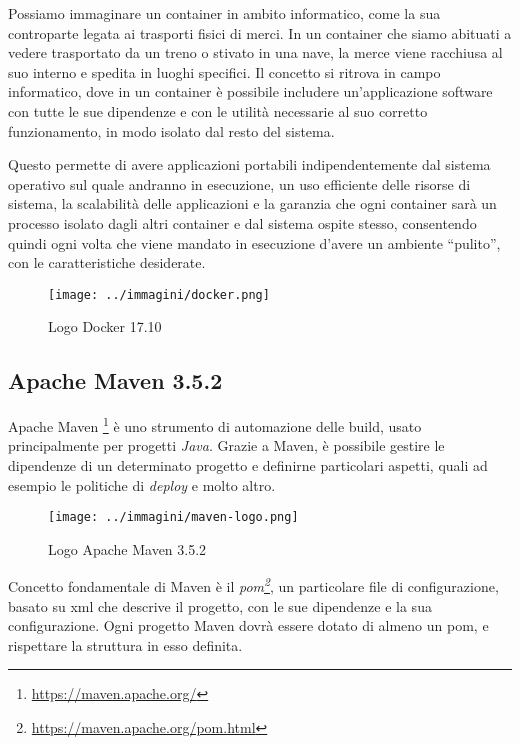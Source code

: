 Possiamo immaginare un container in ambito informatico, come la sua controparte legata ai trasporti fisici di merci. In un container che siamo abituati a vedere trasportato da un treno o stivato in una nave, la merce viene racchiusa al suo interno e spedita in luoghi specifici. Il concetto si ritrova in campo informatico, dove in un container è possibile includere un'applicazione software con tutte le sue dipendenze e con le utilità necessarie al suo corretto funzionamento, in modo isolato dal resto del sistema. 

Questo permette di avere applicazioni portabili indipendentemente dal sistema operativo sul quale andranno in esecuzione, un uso efficiente delle risorse di sistema, la scalabilità delle applicazioni e la garanzia che ogni \gls{container} sarà un processo isolato dagli altri \gls{container} e dal sistema ospite stesso, consentendo quindi ogni volta che viene mandato in esecuzione d'avere un ambiente ``pulito'', con le caratteristiche desiderate. 

\begin{figure}[H]
    \capstart
    \centering
    \texttt{[image: ../immagini/docker.png]}
    \caption{Logo Docker 17.10}
\end{figure}

\subsection{Apache Maven 3.5.2}

Apache Maven \footnote{\url{https://maven.apache.org/}}\cite[Chapter~1]{book:maven-cookbook} è uno strumento di automazione delle \gls{build}\cite{site:introduction-to-the-build-lifecycle}, usato principalmente per progetti \textit{Java}. Grazie a Maven, è possibile gestire le dipendenze di un determinato progetto e definirne particolari aspetti, quali ad esempio le politiche di \textit{\gls{deploy}} e molto altro. \\

\begin{figure}[H]
    \capstart
    \centering
    \texttt{[image: ../immagini/maven-logo.png]}
    \caption{Logo Apache Maven 3.5.2}
\end{figure}

Concetto fondamentale di Maven è il \textit{\gls{pom}\footnote{\url{https://maven.apache.org/pom.html}}}\cite[Chapter~9]{book:maven-reference}, un particolare file di configurazione, basato su \gls{xml} che descrive il progetto, con le sue dipendenze e la sua configurazione. Ogni progetto Maven dovrà essere dotato di almeno un \gls{pom}\cite{site:introduction-to-the-pom}, e rispettare la struttura in esso definita.

